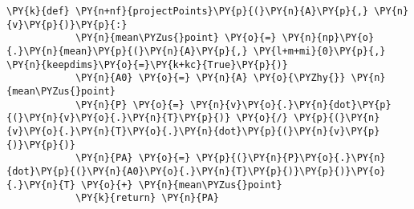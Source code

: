 \begin{Verbatim}[commandchars=\\\{\}]
        \PY{k}{def} \PY{n+nf}{projectPoints}\PY{p}{(}\PY{n}{A}\PY{p}{,} \PY{n}{v}\PY{p}{)}\PY{p}{:}
            \PY{n}{mean\PYZus{}point} \PY{o}{=} \PY{n}{np}\PY{o}{.}\PY{n}{mean}\PY{p}{(}\PY{n}{A}\PY{p}{,} \PY{l+m+mi}{0}\PY{p}{,} \PY{n}{keepdims}\PY{o}{=}\PY{k+kc}{True}\PY{p}{)}
            \PY{n}{A0} \PY{o}{=} \PY{n}{A} \PY{o}{\PYZhy{}} \PY{n}{mean\PYZus{}point}
            \PY{n}{P} \PY{o}{=} \PY{n}{v}\PY{o}{.}\PY{n}{dot}\PY{p}{(}\PY{n}{v}\PY{o}{.}\PY{n}{T}\PY{p}{)} \PY{o}{/} \PY{p}{(}\PY{n}{v}\PY{o}{.}\PY{n}{T}\PY{o}{.}\PY{n}{dot}\PY{p}{(}\PY{n}{v}\PY{p}{)}\PY{p}{)}
            \PY{n}{PA} \PY{o}{=} \PY{p}{(}\PY{n}{P}\PY{o}{.}\PY{n}{dot}\PY{p}{(}\PY{n}{A0}\PY{o}{.}\PY{n}{T}\PY{p}{)}\PY{p}{)}\PY{o}{.}\PY{n}{T} \PY{o}{+} \PY{n}{mean\PYZus{}point}
            \PY{k}{return} \PY{n}{PA}
\end{Verbatim}

